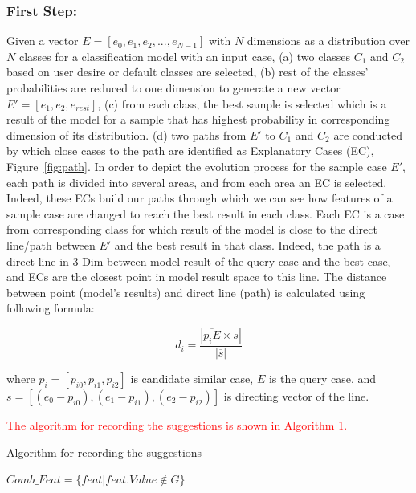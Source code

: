 \documentclass{llncs}
\begin{document}
\subsubsection*{First Step:} Given a vector $E=[e_{0},e_{1},e_{2},...,e_{N-1}]$ with $N$ dimensions as a distribution over $N$ classes for a classification model with an input case, (a) two classes $C_{1}$ and $C_{2}$ based on user desire or default classes are selected, (b) rest of the classes' probabilities are reduced to one dimension to generate a new vector $E'=[e_{1},e_{2},e_{rest}]$, (c) from each class, the best sample is selected which is a result of the model for a sample that has highest probability in corresponding dimension of its distribution. 
(d) two paths from $E'$ to $C_{1}$ and $C_{2}$ are conducted by which close cases to the path are identified as Explanatory Cases (EC), Figure~\ref{fig:path}. In order to depict the evolution process for the sample case $E'$, each path is divided into several areas, and from each area an EC is selected. Indeed, these ECs build our paths through which we can see how features of a sample case are changed to reach the best result in each class. Each EC is a case from corresponding class for which result of the model is close to the direct line/path between $E'$ and the best result in that class. Indeed, the path is a direct line in 3-Dim between model result of the query case and the best case, and ECs are the closest point in model result space to this line. 
The distance between point (model's results) and direct line (path) is calculated using following formula:

\begin{equation}
d_{i} = \frac{\left| \overline{p_{i}E} \times \overline{s} \right|}{\left|\overline{s}\right|}
\end{equation}

\noindent where $p_{i}=[p_{i0},p_{i1},p_{i2}]$ is candidate similar case, $E$ is the query case, and $s=[(e_{0}-p_{i0}),(e_{1}-p_{i1}),(e_{2}-p_{i2})]$ is directing vector of the line.

\textcolor{red}{The algorithm for recording the suggestions is shown in Algorithm 1.}

\begin{algorithm}
	\caption{Algorithm for recording the suggestions}
	\begin{algorithmic}
		\begin{small}
			\State $Comb\_Feat = \{feat | feat.Value \notin G \}$ 
			\EndIf
			\EndFunction
		\end{small}
		
	\end{algorithmic}
\end{algorithm}
\end{document}
